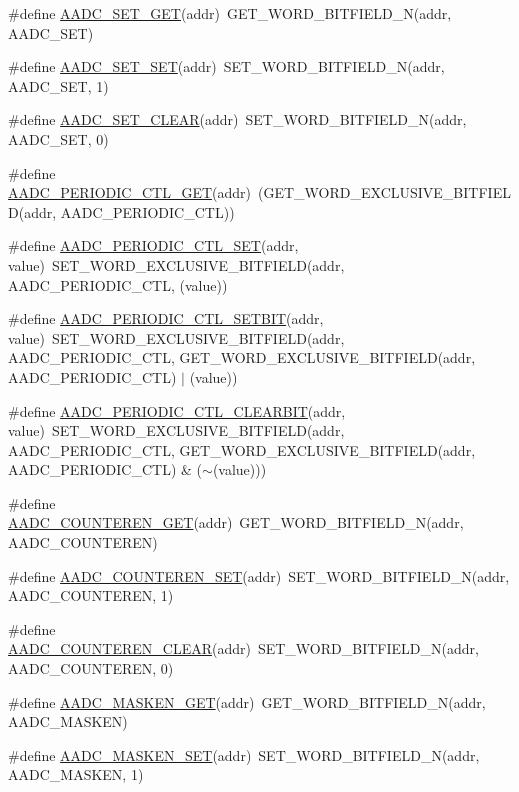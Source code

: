\begin{DoxyCompactItemize}
\item 
\#define \hyperlink{a00542_a21d635a56bc01377082f2cfc38c2f0fa}{AADC\_\-SET\_\-GET}(addr)~GET\_\-WORD\_\-BITFIELD\_\-N(addr, AADC\_\-SET)
\item 
\#define \hyperlink{a00542_a5c217df37ecbd9ef1d46bd9074ab8af4}{AADC\_\-SET\_\-SET}(addr)~SET\_\-WORD\_\-BITFIELD\_\-N(addr, AADC\_\-SET, 1)
\item 
\#define \hyperlink{a00542_a6b382e69d47a2da170174b0306416ec8}{AADC\_\-SET\_\-CLEAR}(addr)~SET\_\-WORD\_\-BITFIELD\_\-N(addr, AADC\_\-SET, 0)
\item 
\#define \hyperlink{a00542_a73cb242badc1760fc74707ebaf2ab55a}{AADC\_\-PERIODIC\_\-CTL\_\-GET}(addr)~(GET\_\-WORD\_\-EXCLUSIVE\_\-BITFIELD(addr, AADC\_\-PERIODIC\_\-CTL))
\item 
\#define \hyperlink{a00542_acd3e13544d8e81a853f2b6ef7903f8f9}{AADC\_\-PERIODIC\_\-CTL\_\-SET}(addr, value)~SET\_\-WORD\_\-EXCLUSIVE\_\-BITFIELD(addr, AADC\_\-PERIODIC\_\-CTL, (value))
\item 
\#define \hyperlink{a00542_a7d9b018cbd88a62510f4576ab6f64427}{AADC\_\-PERIODIC\_\-CTL\_\-SETBIT}(addr, value)~SET\_\-WORD\_\-EXCLUSIVE\_\-BITFIELD(addr, AADC\_\-PERIODIC\_\-CTL, GET\_\-WORD\_\-EXCLUSIVE\_\-BITFIELD(addr, AADC\_\-PERIODIC\_\-CTL) $|$ (value))
\item 
\#define \hyperlink{a00542_a42831b7ffe3a68473c5490e37a357b0a}{AADC\_\-PERIODIC\_\-CTL\_\-CLEARBIT}(addr, value)~SET\_\-WORD\_\-EXCLUSIVE\_\-BITFIELD(addr, AADC\_\-PERIODIC\_\-CTL, GET\_\-WORD\_\-EXCLUSIVE\_\-BITFIELD(addr, AADC\_\-PERIODIC\_\-CTL) \& ($\sim$(value)))
\item 
\#define \hyperlink{a00542_afe526000828267032a5865b741b01791}{AADC\_\-COUNTEREN\_\-GET}(addr)~GET\_\-WORD\_\-BITFIELD\_\-N(addr, AADC\_\-COUNTEREN)
\item 
\#define \hyperlink{a00542_ad69b73cc01f11fb880eedf1ebbfd2880}{AADC\_\-COUNTEREN\_\-SET}(addr)~SET\_\-WORD\_\-BITFIELD\_\-N(addr, AADC\_\-COUNTEREN, 1)
\item 
\#define \hyperlink{a00542_a8f4fe6435ee37508d67c5ce56b1bd58d}{AADC\_\-COUNTEREN\_\-CLEAR}(addr)~SET\_\-WORD\_\-BITFIELD\_\-N(addr, AADC\_\-COUNTEREN, 0)
\item 
\#define \hyperlink{a00542_a56342bdf4b0fe39c455e26c444f98c0f}{AADC\_\-MASKEN\_\-GET}(addr)~GET\_\-WORD\_\-BITFIELD\_\-N(addr, AADC\_\-MASKEN)
\item 
\#define \hyperlink{a00542_a21a4ad70c1fdbd546ea5eb0e7824f66d}{AADC\_\-MASKEN\_\-SET}(addr)~SET\_\-WORD\_\-BITFIELD\_\-N(addr, AADC\_\-MASKEN, 1)

\end{DoxyCompactItemize}
